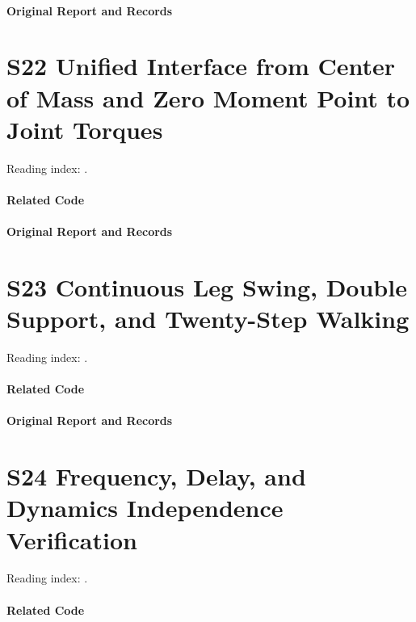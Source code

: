 \paragraph{Original Report and Records}
\noindent{}\par
\section*{S22 Unified Interface from Center of Mass and Zero Moment Point to Joint Torques}
\hypertarget{code-s22}{}
Reading index: .
\paragraph{Related Code}
\noindent{}\par
\paragraph{Original Report and Records}
\noindent{}\par
\section*{S23 Continuous Leg Swing, Double Support, and Twenty-Step Walking}
\hypertarget{code-s23}{}
Reading index: .
\paragraph{Related Code}
\noindent{}\par
\paragraph{Original Report and Records}
\noindent{}\par
\section*{S24 Frequency, Delay, and Dynamics Independence Verification}
\hypertarget{code-s24}{}
Reading index: .
\paragraph{Related Code}
\noindent{}\par
